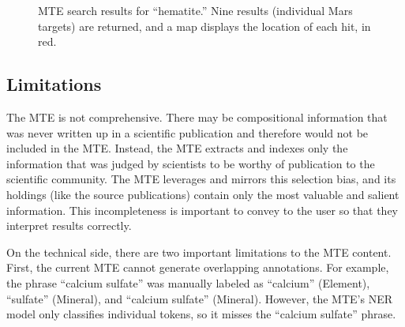 \documentclass[letterpaper]{article} %
\begin{document}
\begin{figure}
\begin{center}
\end{center}
\caption{MTE search results for ``hematite.''  Nine results
(individual Mars targets) are returned, and a map displays the
location of each hit, in red.}
\label{fig:mtesearch}
\end{figure}

\subsection{Limitations}

The MTE is not comprehensive.  There may be compositional information
that was never written up in a scientific publication and therefore
would not be included in the MTE.  Instead, the MTE extracts and
indexes only the information that was judged by scientists to be
worthy of publication to the scientific community.  The MTE leverages
and mirrors this selection bias, and its holdings (like the source
publications) contain only the most valuable and salient information.
This incompleteness is important to convey to the user so that
they interpret results correctly.

On the technical side, there are two important limitations to the MTE
content.  First, the current MTE cannot generate overlapping
annotations.  For example, the phrase ``calcium sulfate'' was manually
labeled as ``calcium'' (Element), ``sulfate'' (Mineral), and
``calcium sulfate'' (Mineral).  However, the MTE's NER model only
classifies individual tokens, so it misses the ``calcium sulfate''
phrase. 
\end{document}
